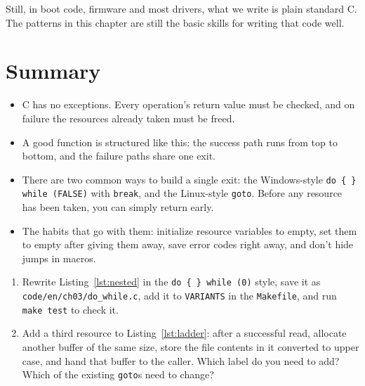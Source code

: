 Still, in boot code, firmware and most drivers, what we write is plain standard C. The patterns in this chapter are still the basic skills for writing that code well.

\section{Summary}

\begin{itemize}
  \item C has no exceptions. Every operation's return value must be checked, and on failure the resources already taken must be freed.
  \item A good function is structured like this: the success path runs from top to bottom, and the failure paths share one exit.
  \item There are two common ways to build a single exit: the Windows-style \texttt{do \{ \} while (FALSE)} with \texttt{break}, and the Linux-style \texttt{goto}. Before any resource has been taken, you can simply return early.
  \item The habits that go with them: initialize resource variables to empty, set them to empty after giving them away, save error codes right away, and don't hide jumps in macros.
\end{itemize}


\begin{enumerate}
  \item Rewrite Listing~\ref{lst:nested} in the \texttt{do \{ \} while (0)} style, save it as \texttt{code/en/ch03/do\_while.c}, add it to \texttt{VARIANTS} in the \texttt{Makefile}, and run \texttt{make test} to check it.
  \item Add a third resource to Listing~\ref{lst:ladder}: after a successful read, allocate another buffer of the same size, store the file contents in it converted to upper case, and hand that buffer to the caller. Which label do you need to add? Which of the existing \texttt{goto}s need to change?
\end{enumerate}
